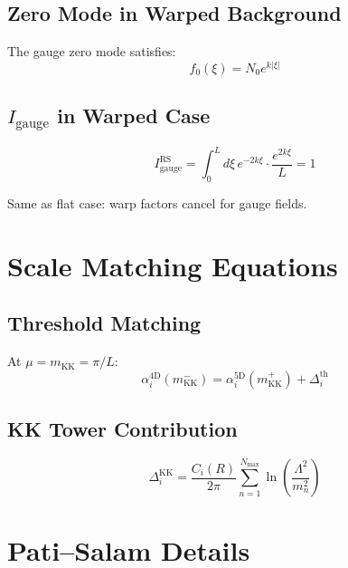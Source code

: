 \documentclass[11pt,a4paper]{article}
\begin{document}
\subsection{Zero Mode in Warped Background}

The gauge zero mode satisfies:
\begin{equation}
  f_0(\xi) = N_0 e^{k|\xi|}
  \label{eq:app-warped-zero}
\end{equation}

\subsection{$I_{\text{gauge}}$ in Warped Case}

\begin{equation}
  I_{\text{gauge}}^{\text{RS}} = \int_0^L d\xi \, e^{-2k\xi} \cdot \frac{e^{2k\xi}}{L} = 1
  \label{eq:app-igauge-rs}
\end{equation}

Same as flat case: warp factors cancel for gauge fields.

\section{Scale Matching Equations}
\label{app:matching}

\subsection{Threshold Matching}

At $\mu = m_{\text{KK}} = \pi/L$:
\begin{equation}
  \alpha_i^{\text{4D}}(m_{\text{KK}}^-) = \alpha_i^{\text{5D}}(m_{\text{KK}}^+)
    + \Delta_i^{\text{th}}
  \label{eq:app-threshold-match}
\end{equation}

\subsection{KK Tower Contribution}

\begin{equation}
  \Delta_i^{\text{KK}} = \frac{C_i(R)}{2\pi} \sum_{n=1}^{N_{\text{max}}}
    \ln\left(\frac{\Lambda^2}{m_n^2}\right)
  \label{eq:app-kk-contribution}
\end{equation}

\section{Pati--Salam Details}
\label{app:ps}
\end{document}
